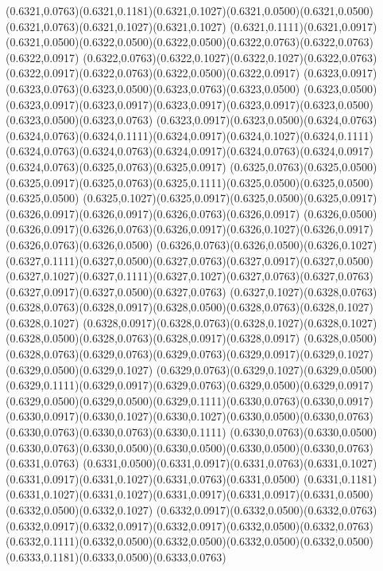 (0.6321,0.0763)(0.6321,0.1181)(0.6321,0.1027)(0.6321,0.0500)(0.6321,0.0500)(0.6321,0.0763)(0.6321,0.1027)(0.6321,0.1027)
(0.6321,0.1111)(0.6321,0.0917)(0.6321,0.0500)(0.6322,0.0500)(0.6322,0.0500)(0.6322,0.0763)(0.6322,0.0763)(0.6322,0.0917)
(0.6322,0.0763)(0.6322,0.1027)(0.6322,0.1027)(0.6322,0.0763)(0.6322,0.0917)(0.6322,0.0763)(0.6322,0.0500)(0.6322,0.0917)
(0.6323,0.0917)(0.6323,0.0763)(0.6323,0.0500)(0.6323,0.0763)(0.6323,0.0500)
\PST@Solid(0.6323,0.0500)(0.6323,0.0917)(0.6323,0.0917)(0.6323,0.0917)(0.6323,0.0917)(0.6323,0.0500)(0.6323,0.0500)(0.6323,0.0763)
(0.6323,0.0917)(0.6323,0.0500)(0.6324,0.0763)(0.6324,0.0763)(0.6324,0.1111)(0.6324,0.0917)(0.6324,0.1027)(0.6324,0.1111)
(0.6324,0.0763)(0.6324,0.0763)(0.6324,0.0917)(0.6324,0.0763)(0.6324,0.0917)(0.6324,0.0763)(0.6325,0.0763)(0.6325,0.0917)
(0.6325,0.0763)(0.6325,0.0500)(0.6325,0.0917)(0.6325,0.0763)(0.6325,0.1111)(0.6325,0.0500)(0.6325,0.0500)(0.6325,0.0500)
(0.6325,0.1027)(0.6325,0.0917)(0.6325,0.0500)(0.6325,0.0917)(0.6326,0.0917)(0.6326,0.0917)(0.6326,0.0763)(0.6326,0.0917)
(0.6326,0.0500)(0.6326,0.0917)(0.6326,0.0763)(0.6326,0.0917)(0.6326,0.1027)(0.6326,0.0917)(0.6326,0.0763)(0.6326,0.0500)
(0.6326,0.0763)(0.6326,0.0500)(0.6326,0.1027)(0.6327,0.1111)(0.6327,0.0500)(0.6327,0.0763)(0.6327,0.0917)(0.6327,0.0500)
(0.6327,0.1027)(0.6327,0.1111)(0.6327,0.1027)(0.6327,0.0763)(0.6327,0.0763)(0.6327,0.0917)(0.6327,0.0500)(0.6327,0.0763)
(0.6327,0.1027)(0.6328,0.0763)(0.6328,0.0763)(0.6328,0.0917)(0.6328,0.0500)(0.6328,0.0763)(0.6328,0.1027)(0.6328,0.1027)
(0.6328,0.0917)(0.6328,0.0763)(0.6328,0.1027)(0.6328,0.1027)(0.6328,0.0500)(0.6328,0.0763)(0.6328,0.0917)(0.6328,0.0917)
(0.6328,0.0500)(0.6328,0.0763)(0.6329,0.0763)(0.6329,0.0763)(0.6329,0.0917)(0.6329,0.1027)(0.6329,0.0500)(0.6329,0.1027)
(0.6329,0.0763)(0.6329,0.1027)(0.6329,0.0500)(0.6329,0.1111)(0.6329,0.0917)(0.6329,0.0763)(0.6329,0.0500)(0.6329,0.0917)
(0.6329,0.0500)(0.6329,0.0500)(0.6329,0.1111)(0.6330,0.0763)(0.6330,0.0917)
\PST@Solid(0.6330,0.0917)(0.6330,0.1027)(0.6330,0.1027)(0.6330,0.0500)(0.6330,0.0763)(0.6330,0.0763)(0.6330,0.0763)(0.6330,0.1111)
(0.6330,0.0763)(0.6330,0.0500)(0.6330,0.0763)(0.6330,0.0500)(0.6330,0.0500)(0.6330,0.0500)(0.6330,0.0763)(0.6331,0.0763)
(0.6331,0.0500)(0.6331,0.0917)(0.6331,0.0763)(0.6331,0.1027)(0.6331,0.0917)(0.6331,0.1027)(0.6331,0.0763)(0.6331,0.0500)
(0.6331,0.1181)(0.6331,0.1027)(0.6331,0.1027)(0.6331,0.0917)(0.6331,0.0917)(0.6331,0.0500)(0.6332,0.0500)(0.6332,0.1027)
(0.6332,0.0917)(0.6332,0.0500)(0.6332,0.0763)(0.6332,0.0917)(0.6332,0.0917)(0.6332,0.0917)(0.6332,0.0500)(0.6332,0.0763)
(0.6332,0.1111)(0.6332,0.0500)(0.6332,0.0500)(0.6332,0.0500)(0.6332,0.0500)(0.6333,0.1181)(0.6333,0.0500)(0.6333,0.0763)
